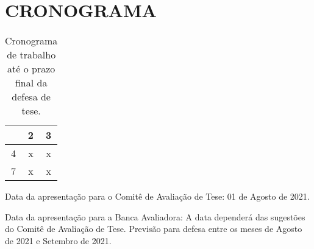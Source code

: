 \chapter{CRONOGRAMA}
\label{cap9:cronograma}


    \begin{table}[H]
      \caption{Cronograma de trabalho até o prazo final da defesa de tese.}
      \centering
      
      \begin{tabular}{|c|c|c|}

      \hline
       & 2 & 3 \\ \hline  								
      4 & x & x \\ \hline
      7 & x & x  \\ 
      \hline
      
      \end{tabular}
  \end{table}
  
Data da apresentação para o Comitê de Avaliação de Tese: 01 de Agosto de 2021.
  
Data da apresentação para a Banca Avaliadora: A data dependerá das sugestões do
Comitê de Avaliação de Tese. Previsão para defesa entre os meses de Agosto  de
2021 e Setembro de 2021.